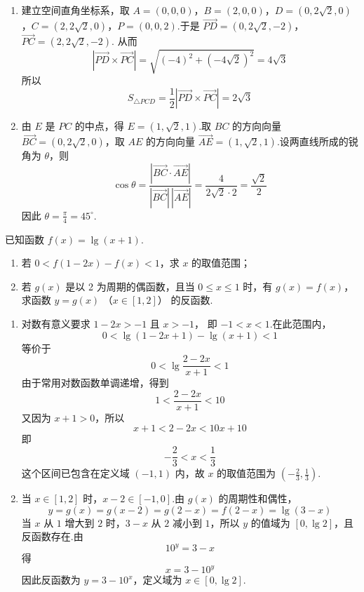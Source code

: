 \begin{solution}
\begin{enumerate}
\item 建立空间直角坐标系，取 \(A=(0,0,0)\)，\(B=(2,0,0)\)，\(D=(0,2\sqrt2,0)\)，\(C=(2,2\sqrt2,0)\)，\(P=(0,0,2)\).于是 \( \overrightarrow{PD}=(0,2\sqrt2,-2)\)，\(\overrightarrow{PC}=(2,2\sqrt2,-2)\).
从而
\[
\left|\overrightarrow{PD}\times\overrightarrow{PC}\right|
=\sqrt{(-4)^2+(-4\sqrt2)^2}=4\sqrt3
\]
所以
\[
S_{\triangle PCD}=\frac12\left|\overrightarrow{PD}\times\overrightarrow{PC}\right|=2\sqrt3
\]

\item 由 \(E\) 是 \(PC\) 的中点，得 \(E=(1,\sqrt2,1)\).取 \(BC\) 的方向向量 \(\overrightarrow{BC}=(0,2\sqrt2,0)\)，取 \(AE\) 的方向向量 \(\overrightarrow{AE}=(1,\sqrt2,1)\).设两直线所成的锐角为 \(\theta\)，则
\[
\cos\theta
=\frac{|\overrightarrow{BC}\cdot\overrightarrow{AE}|}{|\overrightarrow{BC}|\,|\overrightarrow{AE}|}
=\frac{4}{2\sqrt2\cdot2}
=\frac{\sqrt2}{2}
\]
因此 \(\theta=\frac{\pi}{4}=45^\circ\).
\end{enumerate}
\end{solution}

\begin{problem}
已知函数 \( f(x) = \lg (x + 1) \).

\begin{enumerate}
\item 若 \(0 < f(1 - 2x) - f(x) < 1\)，求 \(x\) 的取值范围；
\item 若 \(g(x)\) 是以 2 为周期的偶函数，且当 \(0 \leqslant x \leqslant 1\) 时，有 \(g(x) = f(x)\)，求函数 \(y = g(x)\) （\(x \in [1, 2]\)） 的反函数.
\end{enumerate}
\end{problem}

\begin{solution}
\begin{enumerate}
\item 对数有意义要求 \(1-2x>-1\) 且 \(x>-1\)，
即 \(-1<x<1\).在此范围内，
\[
0<\lg(1-2x+1)-\lg(x+1)<1
\]
等价于
\[
0<\lg\frac{2-2x}{x+1}<1
\]
由于常用对数函数单调递增，得到
\[
1<\frac{2-2x}{x+1}<10
\]
又因为 \(x+1>0\)，所以
\[
x+1<2-2x<10x+10
\]
即
\[
-\frac23<x<\frac13
\]
这个区间已包含在定义域 \((-1,1)\) 内，故 \(x\) 的取值范围为 \(\left(-\frac23,\frac13\right)\).

\item 当 \(x\in[1,2]\) 时，\(x-2\in[-1,0]\).由 \(g(x)\) 的周期性和偶性，
\[
y=g(x)=g(x-2)=g(2-x)=f(2-x)=\lg(3-x)
\]
当 \(x\) 从 \(1\) 增大到 \(2\) 时，\(3-x\) 从 \(2\) 减小到 \(1\)，所以 \(y\) 的值域为 \([0,\lg2]\)，且反函数存在.由
\[
10^y=3-x
\]
得
\[
x=3-10^y
\]
因此反函数为 \(y=3-10^x\)，定义域为 \(x\in[0,\lg2]\).
\end{enumerate}
\end{solution}

